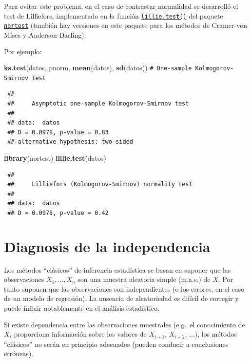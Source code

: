 \documentclass[
  spanish,
  10pt,
]{book}
\newenvironment{Shaded}{\begin{snugshade}}{\end{snugshade}}
\newcommand{\CommentTok}[1]{\textcolor[rgb]{0.56,0.35,0.01}{\textit{#1}}}
\newcommand{\FunctionTok}[1]{\textcolor[rgb]{0.13,0.29,0.53}{\textbf{#1}}}
\newcommand{\NormalTok}[1]{#1}
\theoremstyle{break}
\theoremstyle{nonumberplain}
\renewcommand{\CommentTok}[1]{\textcolor[rgb]{0.41,0.41,0.41}{\texttt{#1}}}
\begin{document}
Para evitar este problema, en el caso de contrastar normalidad se desarrolló el test
de Lilliefors, implementado en la función \href{https://rdrr.io/pkg/nortest/man/lillie.test.html}{\texttt{lillie.test()}} del paquete \href{https://CRAN.R-project.org/package=nortest}{\texttt{nortest}}
(también hay versiones en este paquete para los métodos de Cramer-von Mises y
Anderson-Darling).

Por ejemplo:

\begin{Shaded}
\begin{Highlighting}[]
\FunctionTok{ks.test}\NormalTok{(datos, pnorm, }\FunctionTok{mean}\NormalTok{(datos), }\FunctionTok{sd}\NormalTok{(datos)) }\CommentTok{\# One{-}sample Kolmogorov{-}Smirnov test}
\end{Highlighting}
\end{Shaded}

\begin{verbatim}
 ## 
 ##     Asymptotic one-sample Kolmogorov-Smirnov test
 ## 
 ## data:  datos
 ## D = 0.0978, p-value = 0.83
 ## alternative hypothesis: two-sided
\end{verbatim}

\begin{Shaded}
\begin{Highlighting}[]
\FunctionTok{library}\NormalTok{(nortest)}
\FunctionTok{lillie.test}\NormalTok{(datos)}
\end{Highlighting}
\end{Shaded}

\begin{verbatim}
 ## 
 ##     Lilliefors (Kolmogorov-Smirnov) normality test
 ## 
 ## data:  datos
 ## D = 0.0978, p-value = 0.42
\end{verbatim}

\section{Diagnosis de la independencia}\label{diag-aleat}

Los métodos ``clásicos'' de inferencia estadística se basan en suponer que las observaciones \(X_{1},\ldots,X_{n}\) son una muestra aleatoria simple (m.a.s.) de \(X\).
Por tanto suponen que las observaciones son independientes (o los errores, en el caso de un modelo de regresión).
La ausencia de aleatoriedad es difícil de corregir y puede influir notablemente en el análisis estadístico.

Si existe dependencia entre las observaciones muestrales (e.g.~el conocimiento de \(X_{i}\) proporciona información sobre los valores de \(X_{i+1}\), \(X_{i+2}\), \(\ldots\)), los métodos ``clásicos'' no serán en principio adecuados (pueden conducir a conclusiones erróneas).
\end{document}
